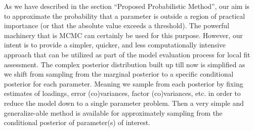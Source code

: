 \documentclass[man, noextraspace, floatsintext, 12pt]{apa7}
\begin{document}
As we have described in the section ``Proposed Probabilistic Method'', our aim is to approximate the probability that a parameter is outside a region of practical importance (or that the absolute value exceeds a threshold).
The powerful machinery that is MCMC can certainly be used for this purpose.
However, our intent is to provide a simpler, quicker, and less computationally intensive approach that can be utilized as part of the model evaluation process for local fit assessment.
The complex posterior distribution built up till now is simplified as we shift from sampling from the marginal posterior to a specific conditional posterior for each parameter.
Meaning we sample from each posterior by fixing estimates of loadings, error (co)variances, factor (co)variances, etc. in order to reduce the model down to a single parameter problem.
Then a very simple and generalize-able method is available for approximately sampling from the conditional posterior of parameter(s) of interest.
\end{document}
